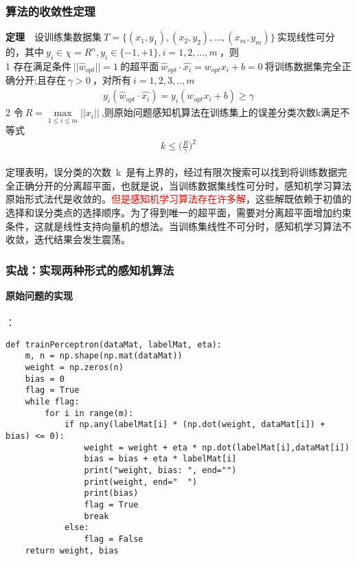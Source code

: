 \subsubsection{算法的收敛性定理}
\textbf{定理}~~设训练集数据集$~T=\{(x_1,y_1),(x_2,y_2),...,(x_m,y_m)\}~$实现线性可分的，其中$~y_i \in \chi=R^n ,y_i \in \{-1,+1\},i=1,2,...,m ~$，则\\
\indent \textcircled{\footnotesize{1}} 存在满足条件$~||\hat{w}_{opt}||=1~$的超平面$~\hat{w}_{opt}\cdot \hat{x_i} = w_{opt}x_i+b=0~$将训练数据集完全正确分开;且存在$~\gamma>0~$，对所有$~i=1,2,3,..,m~$
\begin{align}
  y_i(\hat{w}_{opt}\cdot \hat{x_i}) = y_i(w_{opt}x_i+b)\geq \gamma \nonumber
\end{align}
\indent \textcircled{\footnotesize{2}} 令$~R=\max \limits_{1\leq i\leq m}||x_i||~$,则原始问题感知机算法在训练集上的误差分类次数k满足不等式
\begin{align}
  k\leq \Big(\frac{R}{\gamma}\Big)^2 \nonumber
\end{align}

定理表明，误分类的次数~k~是有上界的，经过有限次搜索可以找到将训练数据完全正确分开的分离超平面，也就是说，当训练数据集线性可分时，感知机学习算法原始形式法代是收敛的。\textcolor{red}{但是感知机学习算法存在许多解}，这些解既依赖于初值的选择和误分类点的选择顺序。为了得到唯一的超平面，需要对分离超平面增加约束条件，这就是线性支持向量机的想法。当训练集线性不可分时，感知机学习算法不收敛，迭代结果会发生震荡。




\subsubsection{实战：实现两种形式的感知机算法}
\textbf{原始问题的实现}\\
~\\
：
\begin{lstlisting}
def trainPerceptron(dataMat, labelMat, eta):
    m, n = np.shape(np.mat(dataMat))
    weight = np.zeros(n)
    bias = 0
    flag = True
    while flag:
        for i in range(m):
            if np.any(labelMat[i] * (np.dot(weight, dataMat[i]) + bias) <= 0):
                weight = weight + eta * np.dot(labelMat[i],dataMat[i])
                bias = bias + eta * labelMat[i]
                print("weight, bias: ", end="")
                print(weight, end="  ")
                print(bias)
                flag = True
                break
            else:
                flag = False
    return weight, bias
\end{lstlisting}

